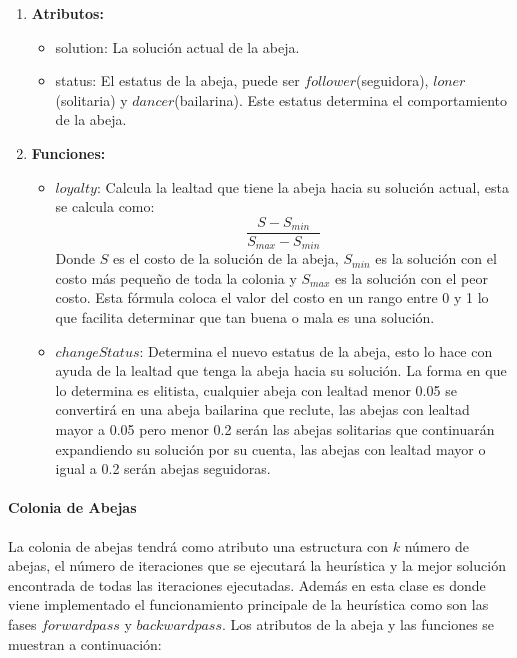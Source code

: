 \documentclass[12pt]{article}
\begin{document}
	\begin{enumerate}
		\item \textbf{Atributos:}
		\begin{itemize}
			\item solution: La solución actual de la abeja.
			\item status: El estatus de la abeja, puede ser $follower$(seguidora), 
			$loner$ (solitaria) y $dancer$(bailarina). Este estatus determina 
			el comportamiento de la abeja.
		\end{itemize}
		\item \textbf{Funciones:}
		\begin{itemize}
			\item $loyalty$: Calcula la lealtad que tiene la abeja hacia su solución
			actual, esta se calcula como:
			\[\frac{S-S_{min}}{S_{max}-S_{min}}\]
			Donde $S$ es el costo de la solución de la abeja, $S_{min}$ es la solución
			con el costo más pequeño de toda la colonia y $S_{max}$ es la solución con
			el peor costo. Esta fórmula coloca el valor del costo en un rango entre 0 
			y 1 lo que facilita determinar que tan buena o mala es una solución.
			\item $changeStatus$: Determina el nuevo estatus de la abeja, esto lo 
			hace con ayuda de la lealtad que tenga la abeja hacia su solución. La forma
			en que lo determina es elitista, cualquier abeja con lealtad menor 0.05 
			se convertirá en una abeja bailarina que reclute, las abejas con lealtad
			mayor a 0.05 pero menor 0.2 serán las abejas solitarias que continuarán
			expandiendo su solución por su cuenta, las abejas con lealtad mayor o 
			igual a 0.2	serán abejas seguidoras.
		\end{itemize}
	\end{enumerate}

	\paragraph{Colonia de Abejas}
	La colonia de abejas tendrá como atributo una estructura con $k$ número de abejas, 
	el número de iteraciones que se ejecutará la heurística y la mejor solución 
	encontrada de todas las iteraciones ejecutadas. Además en esta clase es donde
	viene implementado el funcionamiento principale de la heurística como son las fases
	$forwardpass$ y $backwardpass$.
	Los atributos de la abeja y las funciones se muestran a continuación:
	
\end{document}
